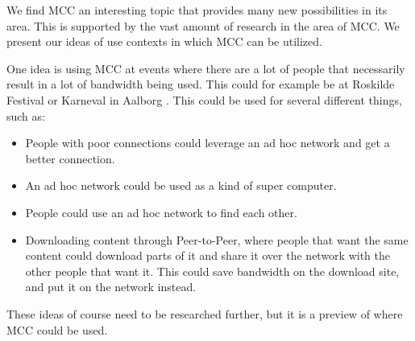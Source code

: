 We find MCC an interesting topic that provides many new possibilities in its area.
This is supported by the vast amount of research in the area of MCC.
We present our ideas of use contexts in which MCC can be utilized.

One idea is using MCC at events where there are a lot of people that necessarily result in a lot of bandwidth being used.
This could for example be at Roskilde Festival\citep{misc:roskilde} or Karneval in Aalborg \citep{misc:karneval}.
This could be used for several different things, such as:

\begin{itemize}
	\item People with poor connections could leverage an ad hoc network and get a better connection.
	\item An ad hoc network could be used as a kind of super computer.
	\item People could use an ad hoc network to find each other. 
	\item Downloading content through Peer-to-Peer, where people that want the same content could download parts of it and share it over the network with the other people that want it. This could save bandwidth on the download site, and put it on the network instead.
\end{itemize}

These ideas of course need to be researched further, but it is a preview of where MCC could be used. 